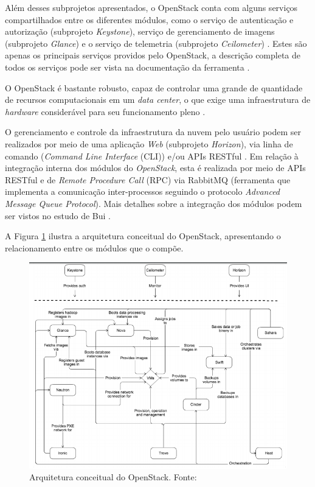 \documentclass[conference]{IEEEtran}
\begin{document}
Além desses subprojetos apresentados, o OpenStack conta com alguns serviços compartilhados entre os diferentes módulos, como o serviço de 
autenticação e autorização (subprojeto \textit{Keystone}), serviço de gerenciamento de imagens (subprojeto \textit{Glance}) e o serviço de 
telemetria (subprojeto \textit{Ceilometer}) \cite{openstack}. Estes são apenas os principais serviços providos pelo OpenStack, a
descrição completa de todos os serviços pode ser vista na documentação da ferramenta \cite{openstack}.

O OpenStack é bastante robusto, capaz de controlar uma grande de quantidade
de recursos computacionais em um \textit{data center}, o que exige uma infraestrutura de \textit{hardware} 
considerável para seu funcionamento pleno \cite{openstack_general} \cite{openstack}.

O gerenciamento e controle da infraestrutura da nuvem pelo usuário podem ser realizados por meio de uma aplicação \textit{Web}
(subprojeto \textit{Horizon}), via linha de comando (\textit{Command Line Interface} (CLI)) e/ou APIs RESTful \cite{bui2016} \cite{openstack}.
Em relação à integração interna dos módulos do \textit{OpenStack}, esta é realizada por meio de APIs RESTful e 
de \textit{Remote Procedure Call} (RPC) via RabbitMQ (ferramenta que implementa a comunicação inter-processos seguindo o protocolo
\textit{Advanced Message Queue Protocol})\cite{bui2016}. Mais detalhes sobre a integração dos módulos podem ser vistos no estudo de Bui \cite{bui2016}.

A Figura \ref{fig:openstack_architecture} ilustra a arquitetura conceitual do OpenStack, apresentando o relacionamento entre os
módulos que o compõe.

\begin{figure}[ht]
\centering
\includegraphics[width=.5\textwidth]{figuras/openstack_architecture.png}
\caption{Arquitetura conceitual do OpenStack. Fonte: \cite{openstack}}
\label{fig:openstack_architecture}
\end{figure}
\end{document}
